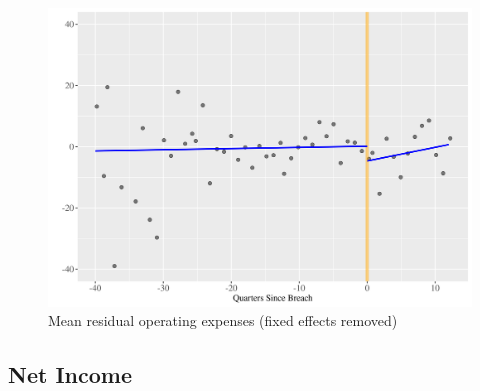 \documentclass[../Main.tex]{subfiles}
\begin{document}
\FloatBarrier

\begin{figure}
    \centering
    \caption{Mean residual operating expenses (fixed effects removed)}
    \label{xoprfig}
    \includegraphics[width=\textwidth]{Images/mean_resid_xoprq_3y.png}
\end{figure}

\FloatBarrier
\clearpage

\subsection{Net Income}
\end{document}
